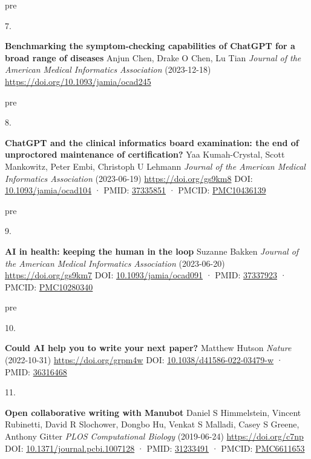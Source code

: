 \documentclass[
]{article}
\newlength{\cslhangindent}
\newlength{\csllabelwidth}
\newlength{\cslentryspacingunit} %
\newenvironment{CSLReferences}[2] %
 {%
  \setlength{\parindent}{0pt}
  \ifodd #1
  \let\oldpar\par
  \def\par{\hangindent=\cslhangindent\oldpar}
  \fi
  \setlength{\parskip}{#2\cslentryspacingunit}
 }%
 {}
\newcommand{\CSLBlock}[1]{#1\hfill\break}
\newcommand{\CSLLeftMargin}[1]{\parbox[t]{\csllabelwidth}{#1}}
\newcommand{\CSLRightInline}[1]{\parbox[t]{\linewidth - \csllabelwidth}{#1}\break}
\providecommand{\DIFaddtex}[1]{{\protect\color{blue}\uwave{#1}}} %
\providecommand{\DIFaddbegin}{} %
\providecommand{\DIFaddend}{} %
\providecommand{\DIFdelbegin}{} %
\providecommand{\DIFdelend}{} %
\providecommand{\DIFadd}[1]{\texorpdfstring{\DIFaddtex{#1}}{#1}} %
\newcommand{\DIFscaledelfig}{0.5}
\newlength{\DIFdelgraphicswidth} %
\newlength{\DIFdelgraphicsheight} %
\newcommand{\DIFaddincludegraphics}[2][]{{\color{blue}\fbox{\DIFOincludegraphics[#1]{#2}}}} %
\newcommand{\DIFdelincludegraphics}[2][]{%
\sbox{\DIFdelgraphicsbox}{\DIFOincludegraphics[#1]{#2}}%
\settoboxwidth{\DIFdelgraphicswidth}{\DIFdelgraphicsbox} %
\settoboxtotalheight{\DIFdelgraphicsheight}{\DIFdelgraphicsbox} %
\scalebox{\DIFscaledelfig}{%
\parbox[b]{\DIFdelgraphicswidth}{\usebox{\DIFdelgraphicsbox}\\[-\baselineskip] \rule{\DIFdelgraphicswidth}{0em}}\llap{\resizebox{\DIFdelgraphicswidth}{\DIFdelgraphicsheight}{%
\setlength{\unitlength}{\DIFdelgraphicswidth}%
\begin{picture}(1,1)%
\thicklines\linethickness{2pt} %
{\color[rgb]{1,0,0}\put(0,0){\framebox(1,1){}}}%
{\color[rgb]{1,0,0}\put(0,0){\line( 1,1){1}}}%
{\color[rgb]{1,0,0}\put(0,1){\line(1,-1){1}}}%
\end{picture}%
}\hspace*{3pt}}} %
} %
\DeclareRobustCommand{\DIFaddbegin}{\DIFOaddbegin \let\includegraphics\DIFaddincludegraphics} %
\DeclareRobustCommand{\DIFaddend}{\DIFOaddend \let\includegraphics\DIFOincludegraphics} %
\DeclareRobustCommand{\DIFdelbegin}{\DIFOdelbegin \let\includegraphics\DIFdelincludegraphics} %
\DeclareRobustCommand{\DIFdelend}{\DIFOaddend \let\includegraphics\DIFOincludegraphics} %
\begin{document}
\begin{CSLReferences}{0}{0}
\leavevmode\vadjust \DIFadd{pre}{\hypertarget{ref-CYB5vhZp}{}}%
\CSLLeftMargin{7. }%
\CSLRightInline{\textbf{Benchmarking the symptom-checking capabilities of ChatGPT for a broad range of diseases}
\CSLBlock{Anjun Chen, Drake O Chen, Lu Tian} \emph{Journal of the American Medical Informatics Association} (2023-12-18) \url{https://doi.org/10.1093/jamia/ocad245}}

\leavevmode\vadjust \DIFadd{pre}{\hypertarget{ref-h8wInPLE}{}}%
\CSLLeftMargin{8. }%
\CSLRightInline{\textbf{ChatGPT and the clinical informatics board examination: the end of unproctored maintenance of certification?}
\CSLBlock{Yaa Kumah-Crystal, Scott Mankowitz, Peter Embi, Christoph U Lehmann} \emph{Journal of the American Medical Informatics Association} (2023-06-19) \url{https://doi.org/gs9km8}
\CSLBlock{DOI: \href{https://doi.org/10.1093/jamia/ocad104}{10.1093/jamia/ocad104} · PMID: \href{https://www.ncbi.nlm.nih.gov/pubmed/37335851}{37335851} · PMCID: \href{https://www.ncbi.nlm.nih.gov/pmc/articles/PMC10436139}{PMC10436139}}}

\leavevmode\vadjust \DIFadd{pre}{\hypertarget{ref-Z2ek25Ak}{}}%
\CSLLeftMargin{9. }%
\CSLRightInline{\textbf{AI in health: keeping the human in the loop}
\CSLBlock{Suzanne Bakken} \emph{Journal of the American Medical Informatics Association} (2023-06-20) \url{https://doi.org/gs9km7}
\CSLBlock{DOI: \href{https://doi.org/10.1093/jamia/ocad091}{10.1093/jamia/ocad091} · PMID: \href{https://www.ncbi.nlm.nih.gov/pubmed/37337923}{37337923} · PMCID: \href{https://www.ncbi.nlm.nih.gov/pmc/articles/PMC10280340}{PMC10280340}}}

\leavevmode\vadjust \DIFadd{pre}{\hypertarget{ref-Svww2RUh}{}}%
\CSLLeftMargin{10. }%
\DIFaddend \CSLRightInline{\textbf{Could AI help you to write your next paper?}
\CSLBlock{Matthew Hutson} \emph{Nature} (2022-10-31) \url{https://doi.org/grpm4w}
\CSLBlock{DOI: \href{https://doi.org/10.1038/d41586-022-03479-w}{10.1038/d41586-022-03479-w} · PMID: \href{https://www.ncbi.nlm.nih.gov/pubmed/36316468}{36316468}}}

\leavevmode{}%
\DIFdelbegin %
\DIFdelend \DIFaddbegin \CSLLeftMargin{11. }\DIFaddend %
\CSLRightInline{\textbf{Open collaborative writing with Manubot}
\CSLBlock{Daniel S Himmelstein, Vincent Rubinetti, David R Slochower, Dongbo Hu, Venkat S Malladi, Casey S Greene, Anthony Gitter} \emph{PLOS Computational Biology} (2019-06-24) \url{https://doi.org/c7np}
\CSLBlock{DOI: \href{https://doi.org/10.1371/journal.pcbi.1007128}{10.1371/journal.pcbi.1007128} · PMID: \href{https://www.ncbi.nlm.nih.gov/pubmed/31233491}{31233491} · PMCID: \href{https://www.ncbi.nlm.nih.gov/pmc/articles/PMC6611653}{PMC6611653}}}


\end{CSLReferences}
\end{document}
